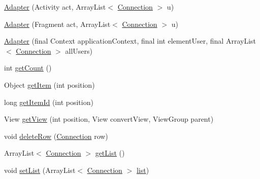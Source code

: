 \begin{DoxyCompactItemize}
\item 
\hyperlink{classes_1_1ucm_1_1tfg_1_1controlremotolinux_1_1client_1_1view_1_1Adapter_aaaccf53948ca0c78e3d5b743256af164}{Adapter} (Activity act, Array\-List$<$ \hyperlink{classes_1_1ucm_1_1tfg_1_1controlremotolinux_1_1client_1_1model_1_1sql_1_1Connection}{Connection} $>$ u)
\item 
\hyperlink{classes_1_1ucm_1_1tfg_1_1controlremotolinux_1_1client_1_1view_1_1Adapter_a12c5c0b9dce91a1d6fabbc36424b4391}{Adapter} (Fragment act, Array\-List$<$ \hyperlink{classes_1_1ucm_1_1tfg_1_1controlremotolinux_1_1client_1_1model_1_1sql_1_1Connection}{Connection} $>$ u)
\item 
\hyperlink{classes_1_1ucm_1_1tfg_1_1controlremotolinux_1_1client_1_1view_1_1Adapter_aa104bc5389d4eda3014e9cc672e45986}{Adapter} (final Context application\-Context, final int element\-User, final Array\-List$<$ \hyperlink{classes_1_1ucm_1_1tfg_1_1controlremotolinux_1_1client_1_1model_1_1sql_1_1Connection}{Connection} $>$ all\-Users)
\item 
int \hyperlink{classes_1_1ucm_1_1tfg_1_1controlremotolinux_1_1client_1_1view_1_1Adapter_a0242f9c7adedd76ae9ffc136fb49390e}{get\-Count} ()
\item 
Object \hyperlink{classes_1_1ucm_1_1tfg_1_1controlremotolinux_1_1client_1_1view_1_1Adapter_a367db7b90709004b2366114112c7e824}{get\-Item} (int position)
\item 
long \hyperlink{classes_1_1ucm_1_1tfg_1_1controlremotolinux_1_1client_1_1view_1_1Adapter_a5e7a0c06b03921761243e9e951feb9b7}{get\-Item\-Id} (int position)
\item 
View \hyperlink{classes_1_1ucm_1_1tfg_1_1controlremotolinux_1_1client_1_1view_1_1Adapter_a5b6aba97e72cb9ade32e80fdf347ca13}{get\-View} (int position, View convert\-View, View\-Group parent)
\item 
void \hyperlink{classes_1_1ucm_1_1tfg_1_1controlremotolinux_1_1client_1_1view_1_1Adapter_a589e3fd2cc5ec5092d10b45c64e8a9fa}{delete\-Row} (\hyperlink{classes_1_1ucm_1_1tfg_1_1controlremotolinux_1_1client_1_1model_1_1sql_1_1Connection}{Connection} row)
\item 
Array\-List$<$ \hyperlink{classes_1_1ucm_1_1tfg_1_1controlremotolinux_1_1client_1_1model_1_1sql_1_1Connection}{Connection} $>$ \hyperlink{classes_1_1ucm_1_1tfg_1_1controlremotolinux_1_1client_1_1view_1_1Adapter_afacdaaa3001cbeee08ae76210be55f95}{get\-List} ()
\item 
void \hyperlink{classes_1_1ucm_1_1tfg_1_1controlremotolinux_1_1client_1_1view_1_1Adapter_a511354ee7c4a29b69be7de4a4dfd4e7e}{set\-List} (Array\-List$<$ \hyperlink{classes_1_1ucm_1_1tfg_1_1controlremotolinux_1_1client_1_1model_1_1sql_1_1Connection}{Connection} $>$ \hyperlink{classes_1_1ucm_1_1tfg_1_1controlremotolinux_1_1client_1_1view_1_1Adapter_abb82be6d61fd4f29e186da511fcf8199}{list})
\end{DoxyCompactItemize}
